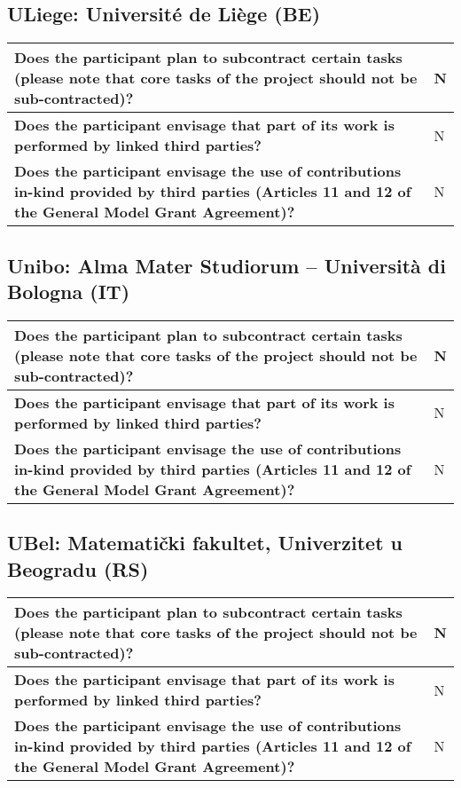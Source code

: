 \subsection*{ULiege: Université de Liège (BE)}

\begin{longtable}{|p{}|p{}|}
\hline
{\bf Does the participant plan to subcontract certain tasks (please
  note that core tasks of the project should not be sub-contracted)?}
&
N
\\
\hline
{\bf Does the participant envisage that  part of its work is performed
  by linked third parties?}
&
N
\\
\hline
{\bf Does the participant envisage the use of contributions in-kind
provided by third parties (Articles 11 and 12 of the General Model
Grant Agreement)?}
&
N
\\
\hline
\end{longtable}

\subsection*{Unibo: Alma Mater Studiorum – Università di Bologna (IT)}

\begin{longtable}{|p{}|p{}|}
\hline
{\bf Does the participant plan to subcontract certain tasks (please
  note that core tasks of the project should not be sub-contracted)?}
&
N
\\
\hline
{\bf Does the participant envisage that  part of its work is performed
  by linked third parties?}
&
N
\\
\hline
{\bf Does the participant envisage the use of contributions in-kind
provided by third parties (Articles 11 and 12 of the General Model
Grant Agreement)?}
&
N
\\
\hline
\end{longtable}

\subsection*{UBel: Matematički fakultet, Univerzitet u Beogradu (RS)}

\begin{longtable}{|p{}|p{}|}
\hline
{\bf Does the participant plan to subcontract certain tasks (please
  note that core tasks of the project should not be sub-contracted)?}
&
N
\\
\hline
{\bf Does the participant envisage that  part of its work is performed
  by linked third parties?}
&
N
\\
\hline
{\bf Does the participant envisage the use of contributions in-kind
provided by third parties (Articles 11 and 12 of the General Model
Grant Agreement)?}
&
N
\\
\hline
\end{longtable}

